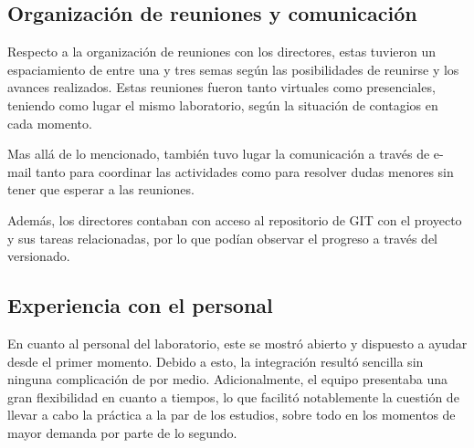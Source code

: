 \documentclass[a4paper,10pt]{article}
\begin{document}
\subsection{Organización de reuniones y comunicación}
Respecto a la organización de reuniones con los directores, estas tuvieron un espaciamiento de entre una y tres semas según las posibilidades de reunirse y los avances realizados. Estas reuniones fueron tanto virtuales como presenciales, teniendo como lugar el mismo laboratorio, según la situación de contagios en cada momento.
\par
Mas allá de lo mencionado, también tuvo lugar la comunicación a través de e-mail tanto para coordinar las actividades como para resolver dudas menores sin tener que esperar a las reuniones.
\par
Además, los directores contaban con acceso al repositorio de GIT con el proyecto y sus tareas relacionadas, por lo que podían observar el progreso a través del versionado.
\subsection{Experiencia con el personal}
En cuanto al personal del laboratorio, este se mostró abierto y dispuesto a ayudar desde el primer momento. Debido a esto, la integración resultó sencilla sin ninguna complicación de por medio. Adicionalmente, el equipo presentaba una gran flexibilidad en cuanto a tiempos,
lo que facilitó notablemente la cuestión de llevar a cabo la práctica a la par de los estudios, sobre todo en los momentos de mayor demanda por parte de lo segundo.
\end{document}
